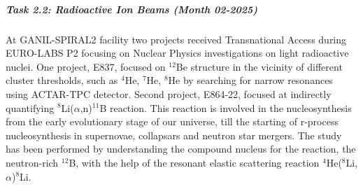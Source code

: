\subparagraph{Task 2.2: Radioactive Ion Beams (Month 02-2025)} \mbox{}


At GANIL-SPIRAL2 facility two projects received Transnational Access during EURO-LABS P2 focusing on Nuclear Physics investigations on light radioactive nuclei. One project, E837, focused on $^{12}$Be structure in the vicinity of different cluster thresholds, such as $^4$He, $^7$He, $^8$He by searching for narrow resonances using ACTAR-TPC detector. Second project, E864-22, focused at indirectly quantifying $^8$Li($\alpha$,n)$^{11}$B reaction. This reaction is involved in the nucleosynthesis from the early evolutionary stage of our universe, till the starting of r-process nucleosynthesis in supernovae, collapsars and neutron star mergers. The study has been performed by understanding the compound nucleus for the reaction, the neutron-rich $^{12}$B, with the help of the resonant elastic scattering reaction $^4$He($^8$Li,$\alpha$)$^8$Li.

